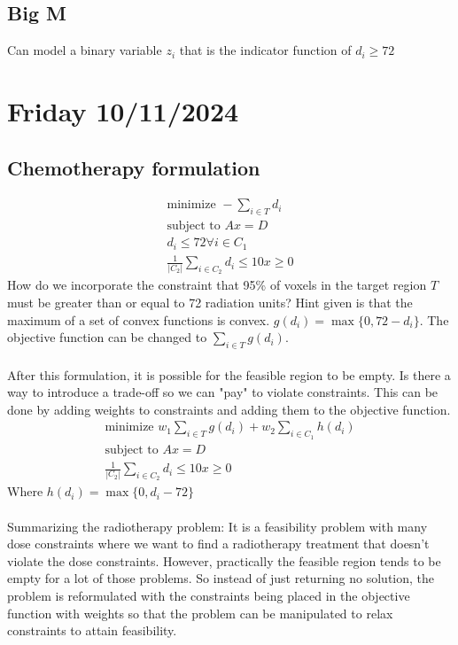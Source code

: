 \subsection{Big M}
Can model a binary variable $z_i$ that is the indicator function of $d_i \geq 72$

\section{Friday 10/11/2024}
\subsection{Chemotherapy formulation}
\begin{equation}
  \begin{aligned}
    \text{minimize } -\sum_{i \in T} d_i \\
    \text{subject to } Ax = D \\
    d_i \leq 72 \forall i \in C_1 \\
    \frac{1}{|C_2|} \sum_{i \in C_2} d_i \leq 10
    x \geq 0
  \end{aligned}
\end{equation}
How do we incorporate the constraint that 95\% of voxels in the target region $T$ must be greater than or equal to 72 radiation units? Hint given is that the maximum of a set of convex functions is convex. $g(d_i) = \max \{ 0 , 72-d_i \}$. The objective function can be changed to $\sum_{i \in T} g(d_i)$. \\ \\
After this formulation, it is possible for the feasible region to be empty. Is there a way to introduce a trade-off so we can "pay" to violate constraints. This can be done by adding weights to constraints and adding them to the objective function.
\begin{equation}
  \begin{aligned}
    \text{minimize } w_1 \sum_{i \in T} g(d_i) + w_2 \sum_{i \in C_1} h(d_i) \\
    \text{subject to } Ax = D \\
    \frac{1}{|C_2|} \sum_{i \in C_2} d_i \leq 10
    x \geq 0
  \end{aligned}
\end{equation}
Where $h(d_i) = \max \{ 0 , d_i - 72 \}$ \\ \\
Summarizing the radiotherapy problem: It is a feasibility problem with many dose constraints where we want to find a radiotherapy treatment that doesn't violate the dose constraints. However, practically the feasible region tends to be empty for a lot of those problems. So instead of just returning no solution, the problem is reformulated with the constraints being placed in the objective function with weights so that the problem can be manipulated to relax constraints to attain feasibility.
